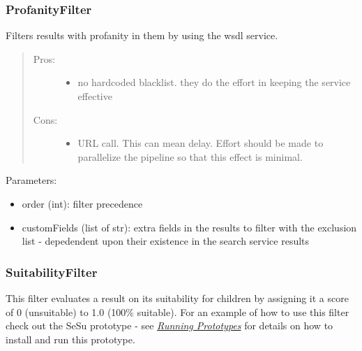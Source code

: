 \documentclass[letterpaper,10pt,english]{sphinxmanual}
\begin{document}
\subsubsection{ProfanityFilter}
\label{api3.0:profanityfilter}

\begin{fulllineitems}
\label{api3.0:puppy.result.filter.WdylProfanityFilter}
Filters results with profanity in them by using the wsdl service.
\begin{quote}
\begin{description}
\item[{Pros:}] \leavevmode\begin{itemize}
\item {} 
no hardcoded blacklist. they do the effort in keeping the service
effective

\end{itemize}

\item[{Cons:}] \leavevmode\begin{itemize}
\item {} 
URL call. This can mean delay. Effort should be made to parallelize the
pipeline so that this effect is minimal.

\end{itemize}

\end{description}
\end{quote}

Parameters:
\begin{itemize}
\item {} 
order (int): filter precedence

\item {} 
customFields (list of str): extra fields in the results to filter with the
exclusion list - depedendent upon their existence in the search service
results

\end{itemize}

\end{fulllineitems}



\subsubsection{SuitabilityFilter}
\label{api3.0:suitabilityfilter}
This filter evaluates a result on its suitability for children by assigning it a score of 0 (unsuitable) to 1.0 (100\% suitable). For an example of how to use this filter check out the SeSu prototype - see {\hyperref[prototypes:prototypes]{\emph{Running Prototypes}}} for details on how to install and run this prototype.
\end{document}
